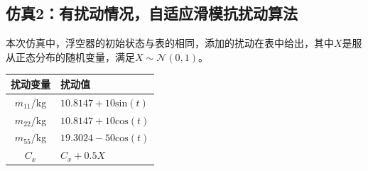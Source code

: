 \subsection{仿真2：有扰动情况，自适应滑模抗扰动算法}\label{sec:sim3-2}
本次仿真中，浮空器的初始状态与表的相同，添加的扰动在表中给出，其中$X$是服从正态分布的随机变量，满足$X\sim\mathcal{N}(0,1)$。
\begin{table}[htp]
    \centering
    \vspace{0.5em}
    \begin{tabular}{cl}
        \toprule
        扰动变量&扰动值  \\
        \midrule
        $m_{11}$/kg&$10.8147+10\mathrm{sin}(t)$\\
        $m_{22}$/kg&$10.8147+10\mathrm{cos}(t)$\\
        $m_{55}$/kg&$19.3024-50\mathrm{cos}(t)$\\
        $C_x$&$C_x+0.5X$\\
        \bottomrule
    \end{tabular}    
\end{table}

